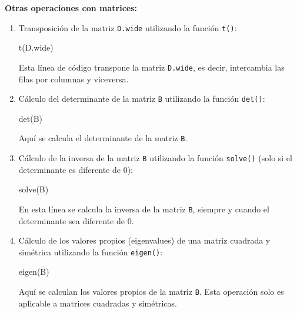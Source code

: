 \documentclass[
  jou,
  floatsintext,
  longtable,
  a4paper,
  nolmodern,
  notxfonts,
  notimes,
  12pt,
  colorlinks=true,linkcolor=blue,citecolor=blue,urlcolor=blue]{apa7}
\newenvironment{Shaded}{\begin{snugshade}}{\end{snugshade}}
\newcommand{\FunctionTok}[1]{\textcolor[rgb]{0.28,0.35,0.67}{#1}}
\newcommand{\NormalTok}[1]{\textcolor[rgb]{0.00,0.23,0.31}{#1}}
\begin{document}
\textbf{Otras operaciones con matrices:}

\begin{enumerate}
\def\labelenumi{\arabic{enumi}.}
\item
  Transposición de la matriz \texttt{D.wide} utilizando la función
  \texttt{t()}:

\begin{Shaded}
\begin{Highlighting}[]
\FunctionTok{t}\NormalTok{(D.wide)}
\end{Highlighting}
\end{Shaded}

  Esta línea de código transpone la matriz \texttt{D.wide}, es decir,
  intercambia las filas por columnas y viceversa.
\item
  Cálculo del determinante de la matriz \texttt{B} utilizando la función
  \texttt{det()}:

\begin{Shaded}
\begin{Highlighting}[]
\FunctionTok{det}\NormalTok{(B)}
\end{Highlighting}
\end{Shaded}

  Aquí se calcula el determinante de la matriz \texttt{B}.
\item
  Cálculo de la inversa de la matriz \texttt{B} utilizando la función
  \texttt{solve()} (solo si el determinante es diferente de 0):

\begin{Shaded}
\begin{Highlighting}[]
\FunctionTok{solve}\NormalTok{(B)}
\end{Highlighting}
\end{Shaded}

  En esta línea se calcula la inversa de la matriz \texttt{B}, siempre y
  cuando el determinante sea diferente de 0.
\item
  Cálculo de los valores propios (eigenvalues) de una matriz cuadrada y
  simétrica utilizando la función \texttt{eigen()}:

\begin{Shaded}
\begin{Highlighting}[]
\FunctionTok{eigen}\NormalTok{(B)}
\end{Highlighting}
\end{Shaded}

  Aquí se calculan los valores propios de la matriz \texttt{B}. Esta
  operación solo es aplicable a matrices cuadradas y simétricas.
\end{enumerate}
\end{document}
